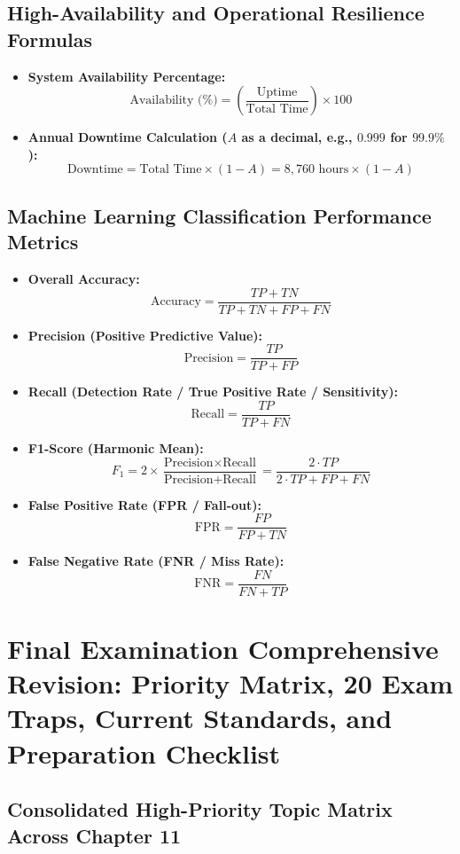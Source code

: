 \subsection{High-Availability and Operational Resilience Formulas}

\begin{itemize}
\item \textbf{System Availability Percentage:}
\[ \text{Availability (\%)} = \left( \frac{\text{Uptime}}{\text{Total Time}} \right) \times 100 \]
\item \textbf{Annual Downtime Calculation ($A$ as a decimal, e.g., $0.999$ for $99.9\%$):}
\[ \text{Downtime} = \text{Total Time} \times (1 - A) = 8,760\text{ hours} \times (1 - A) \]
\end{itemize}

\subsection{Machine Learning Classification Performance Metrics}

\begin{itemize}
\item \textbf{Overall Accuracy:}
\[ \text{Accuracy} = \frac{TP + TN}{TP + TN + FP + FN} \]
\item \textbf{Precision (Positive Predictive Value):}
\[ \text{Precision} = \frac{TP}{TP + FP} \]
\item \textbf{Recall (Detection Rate / True Positive Rate / Sensitivity):}
\[ \text{Recall} = \frac{TP}{TP + FN} \]
\item \textbf{F1-Score (Harmonic Mean):}
\[ F_1 = 2 \times \frac{\text{Precision} \times \text{Recall}}{\text{Precision} + \text{Recall}} = \frac{2 \cdot TP}{2 \cdot TP + FP + FN} \]
\item \textbf{False Positive Rate (FPR / Fall-out):}
\[ \text{FPR} = \frac{FP}{FP + TN} \]
\item \textbf{False Negative Rate (FNR / Miss Rate):}
\[ \text{FNR} = \frac{FN}{FN + TP} \]
\end{itemize}

\newpage
\section{Final Examination Comprehensive Revision: Priority Matrix, 20 Exam Traps, Current Standards, and Preparation Checklist}

\subsection{Consolidated High-Priority Topic Matrix Across Chapter 11}

